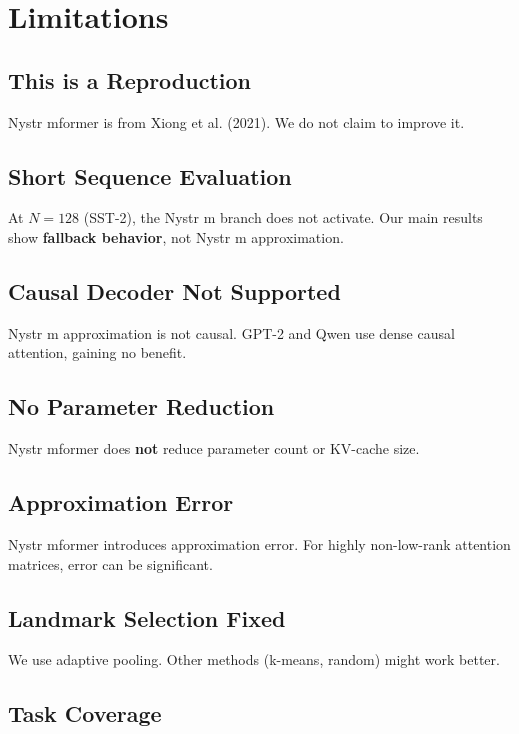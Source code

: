 
\section{Limitations}

\subsection{This is a Reproduction}

Nystr mformer is from Xiong et al. (2021). We do not claim to improve it.

\subsection{Short Sequence Evaluation}

At $N=128$ (SST-2), the Nystr m branch does not activate. Our main results 
show \textbf{fallback behavior}, not Nystr m approximation.

\subsection{Causal Decoder Not Supported}

Nystr m approximation is not causal. GPT-2 and Qwen use dense causal 
attention, gaining no benefit.

\subsection{No Parameter Reduction}

Nystr mformer does \textbf{not} reduce parameter count or KV-cache size.

\subsection{Approximation Error}

Nystr mformer introduces approximation error. For highly non-low-rank 
attention matrices, error can be significant.

\subsection{Landmark Selection Fixed}

We use adaptive pooling. Other methods (k-means, random) might work better.

\subsection{Task Coverage}

